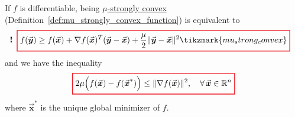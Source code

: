 \documentclass[9pt, headings=standardclasses, parskip=half]{scrartcl}
\newcommand{\vect}[1]{\vec{\boldsymbol{#1}}}
\begin{document}
\newlength{}
{}
\newlength{}
{} 
\tikzexternaldisable
\begin{lemma}
\label{lem:optimality_error_strongly_convex}
If \(f\) is differentiable, being \hyperref[def:mu_strongly_convex_function]{\(\mu\)-strongly convex} (Definition~\ref{def:mu_strongly_convex_function}) is equivalent to
\begin{equation}
\label{eq:strong_convex_differentiable_inequality} %
\llap{\textbf{!}\enspace}
{\color{Red}
\setlength{\fboxrule}{1pt}
\boxed{ 
\color{black}
f(\vect{y})\ge f(\vect{x})+\nabla f(\vect{x})^{T}(\vect{y}-\vect{x})
+\frac{\mu}{2}\|\vect{y}-\vect{x}\|^{2}\tikzmark{mu_strong_convex}%
}
}
\end{equation}
and we have the inequality
\begin{equation}
\label{eq:optimality_error_inequality}
{\color{Red}
\setlength{\fboxrule}{1pt}
\boxed{ 
\color{black}
2\mu\Bigl(f(\vect{x})-f(\vect{x}^{*})\Bigr)\le\|\nabla f(\vect{x})\|^{2},\quad\forall\,\vect{x}\in\mathbb{R}^{n}
}
}
\end{equation}
where \(\vect{x}^{*}\) is the unique global minimizer of \(f\). 
\end{lemma}
\end{document}
